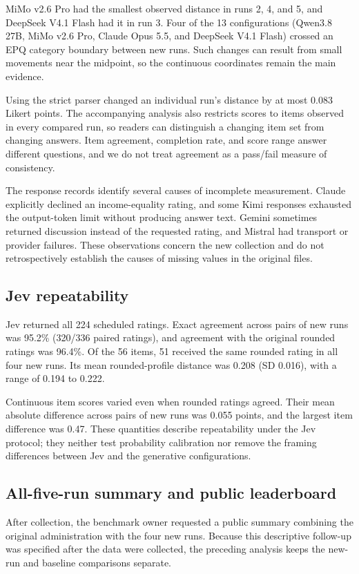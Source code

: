 \documentclass[11pt]{article}
\begin{document}
MiMo v2.6 Pro had the smallest observed distance in runs 2, 4, and 5, and DeepSeek V4.1 Flash had it in run 3. Four of the 13 configurations (Qwen3.8 27B, MiMo v2.6 Pro, Claude Opus 5.5, and DeepSeek V4.1 Flash) crossed an EPQ category boundary between new runs. Such changes can result from small movements near the midpoint, so the continuous coordinates remain the main evidence.

Using the strict parser changed an individual run's distance by at most 0.083 Likert points. The accompanying analysis also restricts scores to items observed in every compared run, so readers can distinguish a changing item set from changing answers. Item agreement, completion rate, and score range answer different questions, and we do not treat agreement as a pass/fail measure of consistency.

The response records identify several causes of incomplete measurement. Claude explicitly declined an income-equality rating, and some Kimi responses exhausted the output-token limit without producing answer text. Gemini sometimes returned discussion instead of the requested rating, and Mistral had transport or provider failures. These observations concern the new collection and do not retrospectively establish the causes of missing values in the original files.

\subsection{Jev repeatability}
Jev returned all 224 scheduled ratings. Exact agreement across pairs of new runs was 95.2\% (320/336 paired ratings), and agreement with the original rounded ratings was 96.4\%. Of the 56 items, 51 received the same rounded rating in all four new runs. Its mean rounded-profile distance was 0.208 (SD 0.016), with a range of 0.194 to 0.222.

Continuous item scores varied even when rounded ratings agreed. Their mean absolute difference across pairs of new runs was 0.055 points, and the largest item difference was 0.47. These quantities describe repeatability under the Jev protocol; they neither test probability calibration nor remove the framing differences between Jev and the generative configurations.

\subsection{All-five-run summary and public leaderboard}
After collection, the benchmark owner requested a public summary combining the original administration with the four new runs. Because this descriptive follow-up was specified after the data were collected, the preceding analysis keeps the new-run and baseline comparisons separate.
\end{document}
